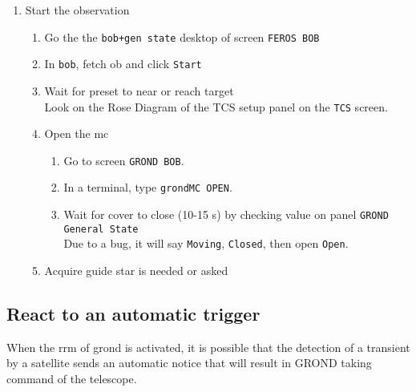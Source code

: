 \documentclass[11pt,fleqn,a4paper]{book}
\makeatletter
\def\menu#1#2{\texttt{#1}\ifx{}#2\else\@for\@x:=#2\do{$\rightarrow$\texttt{\@x}}\fi}
\def\wmenu#1#2{window menu \menu{#1}{#2}}
\makeatother
\begin{document}
\begin{enumerate}
\begin{enumerate}
          If necessary open it from \gls{rtd} with \wmenu{TCS}{\gls{pickrefstar}}
  \end{enumerate}
  \item Start the observation
  \begin{enumerate}
    \item Go the the \texttt{bob+gen state} \gls{desktop} of screen \texttt{FEROS BOB}
    \item In \texttt{bob}, fetch \gls{ob} and click \texttt{Start}
    \item Wait for \gls{preset} to near or reach target\\
          Look on the Rose Diagram of the \gls{TCS setup panel} on the \texttt{TCS} screen.
    \item Open the \gls{mc}
    \begin{enumerate}
      \item Go to screen \texttt{GROND BOB}.
      \item In a terminal, type \texttt{\gls{grondMC} OPEN}.
      \item Wait for cover to close (10-15 s) by checking value on panel \texttt{GROND \gls{General State}}\\
            Due to a bug, it will say \texttt{Moving}, \texttt{Closed}, then open \texttt{Open}. 
    \end{enumerate}
    \item Acquire guide star is needed or asked
  \end{enumerate}
\end{enumerate}


\subsection{React to an automatic trigger}

When the \gls{rrm} of \gls{grond} is activated, it is possible that the detection of a transient by a satellite sends an automatic notice that will result in GROND taking command of the telescope.
\end{document}
